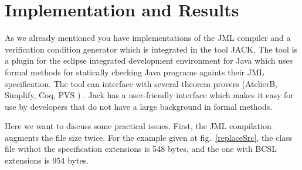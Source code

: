 \section{Implementation and Results}
 As we already mentioned you have implementations of the JML compiler and a verification condition generator which is integrated in the tool JACK.
 The tool is a plugin for the eclipse  integrated development environment for Java which uses formal methods for
statically checking Java programs againts their JML specification. The tool can interface with several theorem provers (AtelierB, 
Simplify, Coq, PVS ) . Jack has a user-friendly interface which makes it easy for use by developers that do not have
a large background in formal methods.

Here we want to discuss some practical issues. First, the JML compilation augments the file size twice. For the example given at fig.~\ref{replaceSrc}, the class 
file withot the specification extensions is 548 bytes, and the one with BCSL extensions is 954 bytes.     

